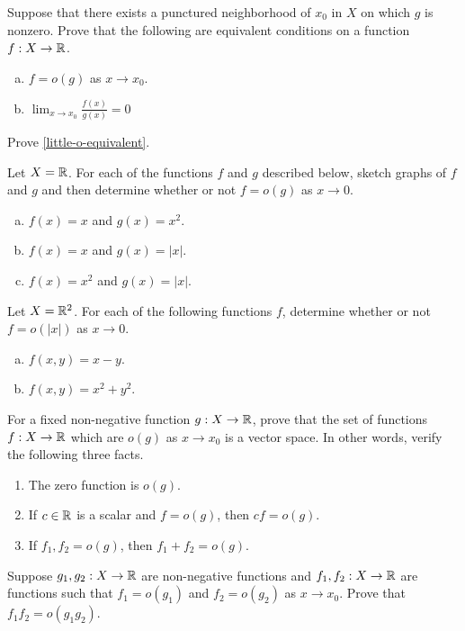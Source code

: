\begin{lemma} \label{little-o-equivalent}
	Suppose that there exists a punctured neighborhood of $x_0$ in $X$ on which $g$ is nonzero. Prove that the following are equivalent conditions on a function $f : X \to \mathbb{R}$. 
	\begin{enumerate}[(a)]
		\item $f = o(g)$ as $x \to x_0$. 
		\item $\displaystyle \lim_{x \to x_0} \frac{f(x)}{g(x)} = 0$
	\end{enumerate}
\end{lemma}

\begin{exercise} \label{little-o-equivalent-exercise}
	Prove \cref{little-o-equivalent}.
\end{exercise}

\begin{exercise}
	Let $X = \mathbb{R}$. For each of the functions $f$ and $g$ described below, sketch graphs of $f$ and $g$ and then determine whether or not $f = o(g)$ as $x \to 0$.
	\begin{enumerate}[(a)]
		\item $f(x) = x$ and $g(x) = x^2$. 
		\item $f(x) = x$ and $g(x) = |x|$. 
		\item $f(x) = x^2$ and $g(x) = |x|$. 
	\end{enumerate}
\end{exercise}

\begin{exercise}
	Let $X = \mathbb{R}^2$. For each of the following functions $f$, determine whether or not $f = o(|x|)$ as $x \to 0$. 
	\begin{enumerate}[(a)]
		\item $f(x,y) = x - y$. 
		\item $f(x,y) = x^2 + y^2$. 
	\end{enumerate}
\end{exercise}

\begin{exercise} \label{little-o-vector-space}
	For a fixed non-negative function $g : X \to \mathbb{R}$, prove that the set of functions $f : X \to \mathbb{R}$ which are $o(g)$ as $x \to x_0$ is a vector space. In other words, verify the following three facts. 
	\begin{enumerate}[(1)]
		\item The zero function is $o(g)$. 
		\item If $c \in \mathbb{R}$ is a scalar and $f = o(g)$, then $cf = o(g)$. 
		\item If $f_1, f_2 = o(g)$, then $f_1 + f_2 = o(g)$. 
	\end{enumerate}
\end{exercise}

\begin{exercise} \label{little-o-multiplicative}
	Suppose $g_1, g_2 : X \to \mathbb{R}$ are non-negative functions and $f_1, f_2 : X \to \mathbb{R}$ are functions such that $f_1 = o(g_1)$ and $f_2 = o(g_2)$ as $x \to x_0$. Prove that $f_1 f_2 = o(g_1 g_2)$. 
\end{exercise}